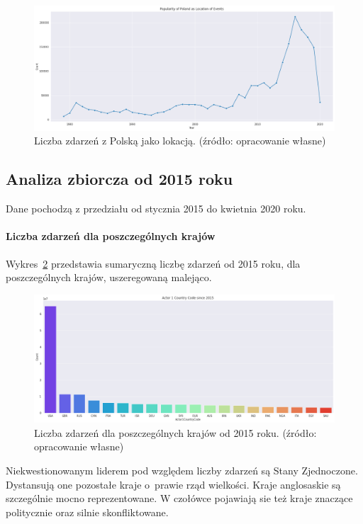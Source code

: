 \documentclass[11pt]{report}
\begin{document}
    \begin{figure}[!htp]
        \centering
        \includegraphics[width=\linewidth]{fig/PL/PLlocation.png}
        \caption{Liczba zdarzeń z Polską jako lokacją. (źródło: opracowanie własne)}
        \label{fig:PLlocation}
    \end{figure}

    \subsection{Analiza zbiorcza od 2015 roku}
    Dane pochodzą z przedziału od stycznia 2015 do kwietnia 2020 roku.

    \paragraph{Liczba zdarzeń dla poszczególnych krajów}
    Wykres~\ref{fig:GLOBALactor1} przedstawia sumaryczną liczbę zdarzeń od 2015 roku, dla poszczególnych krajów, uszeregowaną malejąco.
    \begin{figure}[!htp]
        \centering
        \includegraphics[width=\linewidth]{fig/GLOBAL/Actor1.png}
        \caption{Liczba zdarzeń dla poszczególnych krajów od 2015 roku. (źródło: opracowanie własne)}
        \label{fig:GLOBALactor1}
    \end{figure}
    Niekwestionowanym liderem pod względem liczby zdarzeń są Stany Zjednoczone. Dystansują one pozostałe kraje o~prawie rząd wielkości.
    Kraje anglosaskie są szczególnie mocno reprezentowane.
    W czołówce pojawiają sie też kraje znaczące politycznie oraz silnie skonfliktowane.
\end{document}
